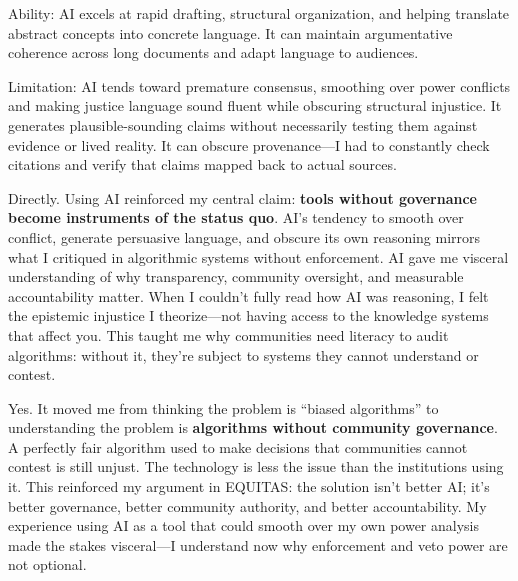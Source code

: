 \documentclass[12pt,a4paper]{article}
\begin{document}
Ability: AI excels at rapid drafting, structural organization, and helping translate abstract concepts into concrete language. It can maintain argumentative coherence across long documents and adapt language to audiences.

Limitation: AI tends toward premature consensus, smoothing over power conflicts and making justice language sound fluent while obscuring structural injustice. It generates plausible-sounding claims without necessarily testing them against evidence or lived reality. It can obscure provenance—I had to constantly check citations and verify that claims mapped back to actual sources.

\begin{tcolorbox}[colback=questionbg,colframe=questionborder,title=\textbf{REFLECTION QUESTION:} Does your experience using AI connect to the ethical issues you researched?]
\end{tcolorbox}

Directly. Using AI reinforced my central claim: \textbf{tools without governance become instruments of the status quo}. AI's tendency to smooth over conflict, generate persuasive language, and obscure its own reasoning mirrors what I critiqued in algorithmic systems without enforcement. AI gave me visceral understanding of why transparency, community oversight, and measurable accountability matter. When I couldn't fully read how AI was reasoning, I felt the epistemic injustice I theorize—not having access to the knowledge systems that affect you. This taught me why communities need literacy to audit algorithms: without it, they're subject to systems they cannot understand or contest.

\begin{tcolorbox}[colback=questionbg,colframe=questionborder,title=\textbf{REFLECTION QUESTION:} Did this experience change your perspective on AI ethics?]
\end{tcolorbox}

Yes. It moved me from thinking the problem is ``biased algorithms'' to understanding the problem is \textbf{algorithms without community governance}. A perfectly fair algorithm used to make decisions that communities cannot contest is still unjust. The technology is less the issue than the institutions using it. This reinforced my argument in EQUITAS: the solution isn't better AI; it's better governance, better community authority, and better accountability. My experience using AI as a tool that could smooth over my own power analysis made the stakes visceral—I understand now why enforcement and veto power are not optional.
\end{document}
